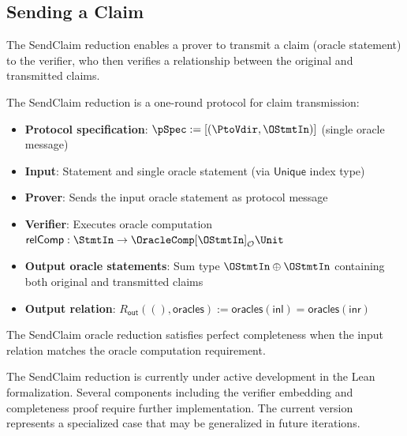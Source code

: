 \subsection{Sending a Claim}

The SendClaim reduction enables a prover to transmit a claim (oracle statement) to the verifier, who then verifies a relationship between the original and transmitted claims.

\begin{definition}
    \label{def:sendclaim_oracle_reduction}
    The SendClaim reduction is a one-round protocol for claim transmission:
    \begin{itemize}
        \item \textbf{Protocol specification}: $\pSpec := [(\PtoVdir, \OStmtIn)]$ (single oracle message)
        \item \textbf{Input}: Statement and single oracle statement (via $\mathsf{Unique}$ index type)
        \item \textbf{Prover}: Sends the input oracle statement as protocol message
        \item \textbf{Verifier}: Executes oracle computation $\mathsf{relComp} : \StmtIn \to \OracleComp[\OStmtIn]_{\mathcal{O}} \Unit$
        \item \textbf{Output oracle statements}: Sum type $\OStmtIn \oplus \OStmtIn$ containing both original and transmitted claims
        \item \textbf{Output relation}: $R_{\mathsf{out}}((), \mathsf{oracles}) := \mathsf{oracles}(\mathsf{inl}) = \mathsf{oracles}(\mathsf{inr})$
    \end{itemize}
\end{definition}

\begin{theorem}
    The SendClaim oracle reduction satisfies perfect completeness when the input relation matches the oracle computation requirement.
\end{theorem}

\begin{remark}
    The SendClaim reduction is currently under active development in the Lean formalization. Several components including the verifier embedding and completeness proof require further implementation. The current version represents a specialized case that may be generalized in future iterations.
\end{remark}

